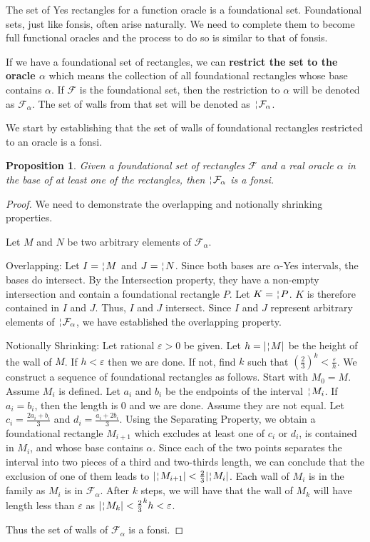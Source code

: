 \documentclass[12pt]{article}
\newtheorem{proposition}{Proposition}[section]
\begin{document}
The set of Yes rectangles for a function oracle is a foundational set. Foundational sets, just like fonsis, often arise naturally. We need to complete them to become full functional oracles and the process to do so is similar to that of fonsis. 

If we have a foundational set of rectangles, we can \textbf{restrict the set to the oracle $\alpha$} which means the collection of all foundational rectangles whose base contains $\alpha$. If $\mathcal{F}$ is the foundational set, then the restriction to $\alpha$ will be denoted as $\mathcal{F}_{\alpha}$. The set of walls from that set will be denoted as $\wall{\mathcal{F}_{\alpha}}$.

We start by establishing that the set of walls of foundational rectangles restricted to an oracle is a fonsi. 

\begin{proposition}
    Given a foundational set of rectangles $\mathcal{F}$ and a real oracle $\alpha$ in the base of at least one of the rectangles, then $\wall{\mathcal{F}_{\alpha}}$ is a fonsi. 
\end{proposition}

\begin{proof}
    We need to demonstrate the overlapping and notionally shrinking properties. 

    Let $M$ and $N$ be two arbitrary elements of $\mathcal{F}_{\alpha}$.

Overlapping: Let $I = \wall{M}$ and $J= \wall{N}$. Since both bases are $\alpha$-Yes intervals, the bases do intersect. By the Intersection property, they have a non-empty intersection and contain a foundational rectangle $P$. Let $K = \wall{P}$. $K$ is therefore contained in $I$ and $J$. Thus, $I$ and $J$ intersect. Since $I$ and $J$ represent arbitrary elements of $\wall{\mathcal{F}_{\alpha}}$, we have established the overlapping property. 

Notionally Shrinking: Let rational $\varepsilon > 0$ be given. Let $h = |\wall{M}|$ be the height of the wall of $M$. If $h < \varepsilon$ then we are done. If not, find $k$ such that $(\frac{2}{3})^k < \frac{\varepsilon}{h}$. We construct a sequence of foundational rectangles as follows. Start with $M_0= M$. Assume $M_i$ is defined. Let $a_i$ and $b_i$ be the endpoints of the interval $\wall{M_i}$. If $a_i=b_i$, then the length is 0 and we are done. Assume they are not equal. Let $c_i =\frac{2a_i + b_i}{3}$ and $d_i = \frac{a_i +2b_i}{3}$. Using the Separating Property, we obtain a foundational rectangle $M_{i+1}$ which excludes at least one of $c_i$ or $d_i$, is contained in $M_i$, and whose base contains $\alpha$. Since each of the two points separates the interval into two pieces of a third and two-thirds length, we can conclude that the exclusion of one of them leads to $|\wall{M_{i+1}}| < \frac{2}{3} |\wall{M_i}|$. Each wall of $M_i$ is in the family as $M_i$ is in $\mathcal{F}_{\alpha}$. After $k$ steps, we will have that the wall of $M_k$ will have length less than $\varepsilon$ as $|\wall{M_k}| < \frac{2}{3}^k h < \varepsilon$.  

Thus the set of walls of $\mathcal{F}_{\alpha}$ is a fonsi.
\end{proof}
\end{document}
